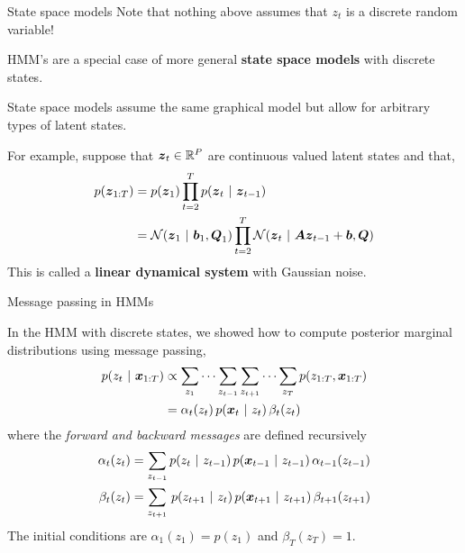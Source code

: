 \documentclass[aspectratio=169]{beamer}
\begin{document}
\begin{frame}{State space models}
Note that nothing above assumes that $z_t$ is a discrete random variable!

HMM's are a special case of more general \textbf{state space models} with discrete states. 

State space models assume the same graphical model but allow for arbitrary types of latent states. 

For example, suppose that $\boldsymbol{z}_t \in \mathbb{R}^P$ are continuous valued latent states and that,
\begin{align}
    p(\boldsymbol{z}_{1:T}) &= p(\boldsymbol{z}_1) \prod_{t=2}^T p(\boldsymbol{z}_t ~\vert~ \boldsymbol{z}_{t-1}) \\
    &= \mathcal{N}(\boldsymbol{z}_1 ~\vert~ \boldsymbol{b}_1, \boldsymbol{Q}_1) \prod_{t=2}^T \mathcal{N}(\boldsymbol{z}_t ~\vert~ \boldsymbol{A} \boldsymbol{z}_{t-1} + \boldsymbol{b}, \boldsymbol{Q}) 
\end{align}
This is called a \textbf{linear dynamical system} with Gaussian noise. 

\end{frame}

\begin{frame}{Message passing in HMMs}

In the HMM with discrete states, we showed how to compute posterior marginal distributions using message passing,
\begin{align}
    p(z_t ~\vert~ \boldsymbol{x}_{1:T}) &\propto \sum_{z_1} \cdots \sum_{z_{t-1}} \sum_{z_{t+1}} \cdots \sum_{z_T} p(z_{1:T}, \boldsymbol{x}_{1:T}) \\
    &= \alpha_t(z_t) \, p(\boldsymbol{x}_t ~\vert~ z_t) \, \beta_t(z_t) 
\end{align}
where the \textit{forward and backward messages} are defined recursively
\begin{align}
    \alpha_t(z_t) &= \sum_{z_{t-1}} p(z_t ~\vert~ z_{t-1}) \, p(\boldsymbol{x}_{t-1} ~\vert~ z_{t-1}) \, \alpha_{t-1}(z_{t-1}) \\
    \beta_t(z_t) &= \sum_{z_{t+1}} \, p(z_{t+1} ~\vert~ z_t) \, p(\boldsymbol{x}_{t+1} ~\vert~ z_{t+1}) \, \beta_{t+1}(z_{t+1})
\end{align}
The initial conditions are $\alpha_1(z_1) = p(z_1)$ and $\beta_{T}(z_T) = 1$.
    
\end{frame}
\end{document}
